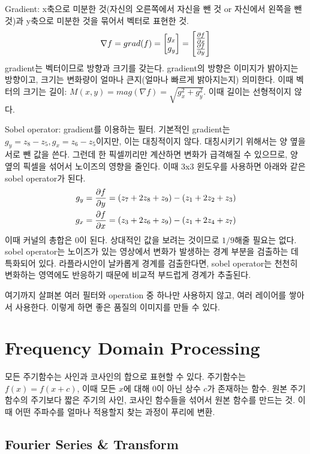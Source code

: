 Gradient: x축으로 미분한 것(자신의 오른쪽에서 자신을 뺀 것 or 자신에서 왼쪽을 뺀 것)과 y축으로 미분한 것을 묶어서 벡터로 표현한 것.
$$
\nabla f = grad(f) = \begin{bmatrix} g_x \\
g_y \end{bmatrix} = \begin{bmatrix} \partial f \over \partial x \\
\partial f \over \partial y \end{bmatrix}
$$
  gradient는 벡터이므로 방향과 크기를 갖는다. gradient의 방향은 이미지가 밝아지는 방향이고, 크기는 변화량이 얼마나 큰지(얼마나 빠르게 밝아지는지) 의미한다. 이때 벡터의 크기는 길이: $M(x, y) = mag(\nabla f) = \sqrt{g_x^2 + g_y^2}$. 이때 길이는 선형적이지 않다.

Sobel operator: gradient를 이용하는 필터. 기본적인 gradient는 $g_y = z_8 - z_5, g_x = z_6 - z_5$이지만, 이는 대칭적이지 않다. 대칭시키기 위해서는 양 옆을 서로 뺀 값을 쓴다. 그런데 한 픽셀끼리만 계산하면 변화가 급격해질 수 있으므로, 양 옆의 픽셀을 섞어서 노이즈의 영향을 줄인다. 이때 3x3 윈도우를 사용하면 아래와 같은 sobel operator가 된다.
$$
\begin{aligned}
  g_y &= {\partial f \over \partial y} = (z_7 + 2z_8 + z_9) - (z_1 + 2z_2 + z_3) \\
  g_x &= {\partial f \over \partial x} = (z_3 + 2z_6 + z_9) - (z_1 + 2z_4 + z_7)
\end{aligned}
$$
이때 커널의 총합은 0이 된다. 상대적인 값을 보려는 것이므로 $1 / 9$해줄 필요는 없다. sobel operator는 노이즈가 있는 영상에서 변화가 발생하는 경계 부분을 검출하는 데 특화되어 있다. 라플라시안이 날카롭게 경계를 검출한다면, sobel operator는 천천히 변화하는 영역에도 반응하기 때문에 비교적 부드럽게 경계가 추출된다.

여기까지 살펴본 여러 필터와 operation 중 하나만 사용하지 않고, 여러 레이어를 쌓아서 사용한다. 이렇게 하면 좋은 품질의 이미지를 만들 수 있다.

\section{Frequency Domain Processing}

모든 주기함수는 사인과 코사인의 합으로 표현할 수 있다. 주기함수는 $f(x) = f(x + c)$, 이때 모든 $x$에 대해 0이 아닌 상수 $c$가 존재하는 함수. 원본 주기함수의 주기보다 짧은 주기의 사인, 코사인 함수들을 섞어서 원본 함수를 만드는 것. 이때 어떤 주파수를 얼마나 적용할지 찾는 과정이 푸리에 변환.

\subsection{Fourier Series \& Transform}


